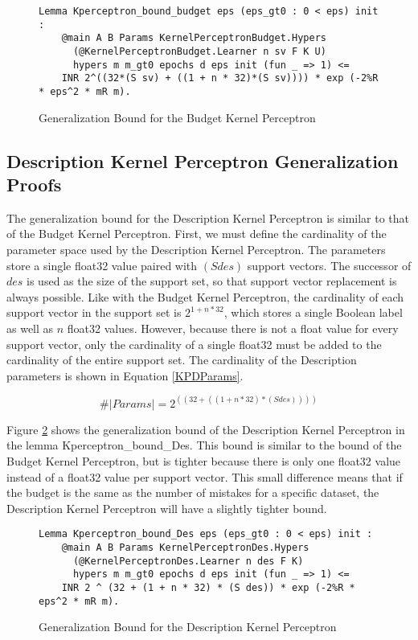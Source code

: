 \begin{figure}
    \caption{Generalization Bound for the Budget Kernel Perceptron}
    \label{KPBLemma}
    \begin{lstlisting}
Lemma Kperceptron_bound_budget eps (eps_gt0 : 0 < eps) init : 
    @main A B Params KernelPerceptronBudget.Hypers 
      (@KernelPerceptronBudget.Learner n sv F K U)
      hypers m m_gt0 epochs d eps init (fun _ => 1) <=
    INR 2^((32*(S sv) + ((1 + n * 32)*(S sv)))) * exp (-2%R * eps^2 * mR m).
    \end{lstlisting}
\end{figure}

\subsection{Description Kernel Perceptron Generalization Proofs}\label{KPDProofs}

The generalization bound for the Description Kernel Perceptron is similar to that of the Budget Kernel Perceptron. First, we must define the cardinality of the parameter space used by the Description Kernel Perceptron. The parameters store a single float32 value paired with $(S des)$ support vectors. The successor of $des$ is used as the size of the support set, so that support vector replacement is always possible. Like with the Budget Kernel Perceptron, the cardinality of each support vector in the support set is $2^{1 + n * 32}$, which stores a single Boolean label as well as $n$ float32 values. However, because there is not a float value for every support vector, only the cardinality of a single float32 must be added to the cardinality of the entire support set. The cardinality of the Description parameters is shown in Equation \ref{KPDParams}.

\begin{equation} \label{KPDParams}
 \#|Params| = 2^{((32 + ((1 + n * 32)*(S des))))}
\end{equation}

Figure \ref{KPDLemma} shows the generalization bound of the Description Kernel Perceptron in the lemma Kperceptron\_bound\_Des. This bound is similar to the bound of the Budget Kernel Perceptron, but is tighter because there is only one float32 value instead of a float32 value per support vector. This small difference means that if the budget is the same as the number of mistakes for a specific dataset, the Description Kernel Perceptron will have a slightly tighter bound. 

\begin{figure}
    \caption{Generalization Bound for the Description Kernel Perceptron}
    \label{KPDLemma}
    \begin{lstlisting}
Lemma Kperceptron_bound_Des eps (eps_gt0 : 0 < eps) init : 
    @main A B Params KernelPerceptronDes.Hypers 
      (@KernelPerceptronDes.Learner n des F K)
      hypers m m_gt0 epochs d eps init (fun _ => 1) <=
    INR 2 ^ (32 + (1 + n * 32) * (S des)) * exp (-2%R * eps^2 * mR m).
    \end{lstlisting}
\end{figure}

